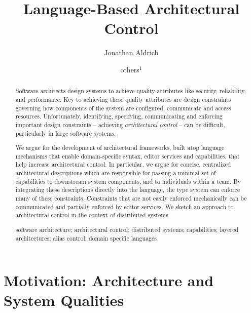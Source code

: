 \documentclass[runningheads]{llncs}
\newcommand{\keywords}[1]{\par\addvspace\baselineskip
\noindent\keywordname\enspace\ignorespaces#1}
\begin{document}
\title{Language-Based Architectural Control}
\author{Jonathan Aldrich \and others$^{1}$}
\setlength{\abovecaptionskip}{0pt}
\setlength{\belowcaptionskip}{0pt}

\maketitle

\begin{sloppypar}
\begin{abstract}
Software architects design systems to achieve quality attributes like security, reliability, and performance. Key to achieving these quality attributes are design constraints governing how components of the system  are configured, communicate and access resources. Unfortunately, identifying, specifying, communicating and enforcing important design  constraints -- achieving \emph{architectural control} -- can be difficult, particularly in large software systems.

We argue for the development of architectural frameworks, built atop language mechanisms that enable domain-specific syntax,  editor services and capabilities, that help increase architectural control. In particular, we argue for concise, centralized architectural descriptions which are responsible for passing a minimal set of capabilities to downstream system components, and to individuals within a team. By integrating these descriptions directly into the language, the type system can enforce many of these constraints. Constraints that are not easily enforced mechanically can be communicated and partially enforced by editor services. We sketch an approach to architectural control in the context of distributed systems.

\keywords{software architecture;
architectural control;
distributed systems;
capabilities;
layered architectures;
alias control;
domain specific languages}

\end{abstract}

\section{Motivation: Architecture and System Qualities}


\end{sloppypar}
\end{document}
